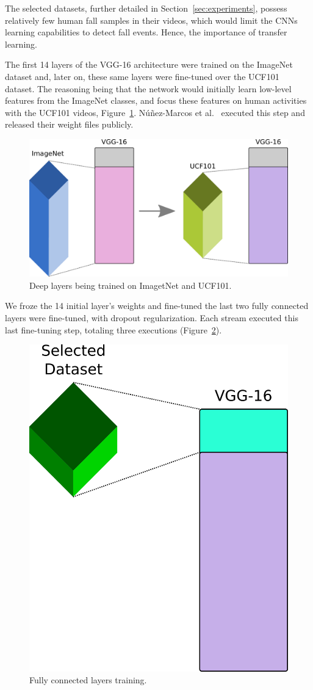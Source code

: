 \documentclass[conference]{IEEEtran}
\begin{document}
The selected datasets, further detailed in Section~\ref{sec:experiments}, possess relatively few human fall samples in their videos, which would limit the CNNs learning capabilities to detect fall events. Hence, the importance of transfer learning.\par
The first 14 layers of the VGG-16 architecture were trained on the ImageNet~\cite{imagenet_cvpr09} dataset and, later on, these same layers were fine-tuned over the UCF101~\cite{soomro2012ucf101} dataset. The reasoning being that the network would initially learn low-level features from the ImageNet classes, and focus these features on human activities with the UCF101 videos, Figure~\ref{fig:pre14}. Núñez-Marcos et al.~\cite{nunez2017vision} executed this step and released their weight files publicly.\par
\begin{figure}[htbp]
\centerline{\includegraphics[width=0.9\linewidth]{figures/pre14.png}}
\caption{Deep layers being trained on ImagetNet and UCF101.}
\label{fig:pre14}
\end{figure}
We froze the 14 initial layer's weights and fine-tuned the
last two fully connected layers were fine-tuned, with dropout
regularization. Each stream executed this last fine-tuning step,
totaling three executions (Figure~\ref{fig:pos14}).
\begin{figure}[htbp]
\centerline{\includegraphics[width=0.4\linewidth]{figures/pos14.png}}
\caption{Fully connected layers training.}
\label{fig:pos14}
\end{figure}
\end{document}
